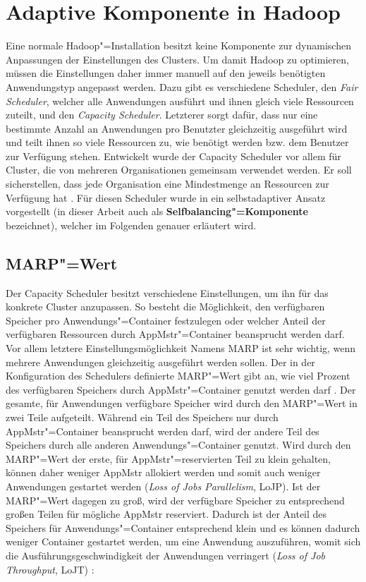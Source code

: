 \section{Adaptive Komponente in Hadoop}
\label{sec:inriaSetting}

Eine normale Hadoop"=Installation besitzt keine Komponente zur dynamischen Anpassungen der Einstellungen des Clusters.
Um damit Hadoop zu optimieren, müssen die Einstellungen daher immer manuell auf den jeweils benötigten Anwendungstyp angepasst werden.
Dazu gibt es \uA verschiedene Scheduler, den \emph{Fair Scheduler}, welcher alle Anwendungen ausführt und ihnen gleich viele Ressourcen zuteilt, und den \emph{Capacity Scheduler}.
Letzterer sorgt dafür, dass nur eine bestimmte Anzahl an Anwendungen pro Benutzter gleichzeitig ausgeführt wird und teilt ihnen so viele Ressourcen zu, wie benötigt werden bzw. dem Benutzer zur Verfügung stehen.
Entwickelt wurde der Capacity Scheduler vor allem für Cluster, die von mehreren Organisationen gemeinsam verwendet werden.
Er soll sicherstellen, dass jede Organisation eine Mindestmenge an Ressourcen zur Verfügung hat \cite{HadoopCapScheduler271}.
Für diesen Scheduler wurde in \cite{Zhang2016} ein selbstadaptiver Ansatz vorgestellt (in dieser Arbeit auch als \textbf{Selfbalancing"=Komponente} bezeichnet), welcher im Folgenden genauer erläutert wird.

\subsection{MARP"=Wert}
\label{subsec:selfbalancingMarp}

Der Capacity Scheduler besitzt verschiedene Einstellungen, um ihn für das konkrete Cluster anzupassen.
So besteht \zB die Möglichkeit, den verfügbaren Speicher pro Anwendungs"=Container festzulegen oder welcher Anteil der verfügbaren Ressourcen durch \gls{AppMstr}"=Container beansprucht werden darf.
Vor allem letztere Einstellungsmöglichkeit Namens \gls{MARP} ist sehr wichtig, wenn mehrere Anwendungen gleichzeitig ausgeführt werden sollen.
Der in der Konfiguration des Schedulers definierte \gls{MARP}"=Wert gibt an, wie viel Prozent des verfügbaren Speichers durch \gls{AppMstr}"=Container genutzt werden darf \cite{HadoopCapScheduler271}.
Der gesamte, für Anwendungen verfügbare Speicher wird durch den \gls{MARP}"=Wert in zwei Teile aufgeteilt.
Während ein Teil des Speichers nur durch \gls{AppMstr}"=Container beansprucht werden darf, wird der andere Teil des Speichers durch alle anderen Anwendungs"=Container genutzt.
Wird durch den \gls{MARP}"=Wert der erste, für \gls{AppMstr}"=reservierten Teil zu klein gehalten, können daher weniger \gls{AppMstr} allokiert werden und somit auch weniger Anwendungen gestartet werden (\emph{Loss of Jobs Parallelism}, LoJP).
Ist der \gls{MARP}"=Wert dagegen zu groß, wird der verfügbare Speicher zu entsprechend großen Teilen für mögliche \gls{AppMstr} reserviert.
Dadurch ist der Anteil des Speichers für Anwendungs"=Container entsprechend klein und es können dadurch weniger Container gestartet werden, um eine Anwendung auszuführen, womit sich die Ausführungsgeschwindigkeit der Anwendungen verringert (\emph{Loss of Job Throughput}, LoJT) \cite{Zhang2016}:

